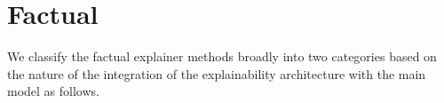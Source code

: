 \section{Factual}
\label{sec:sourav_:Factual}
We classify the factual explainer methods broadly into two categories based on the nature of the integration of the explainability architecture with the main model as follows.


